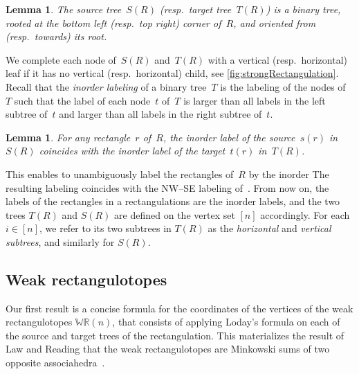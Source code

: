 \documentclass{amsart}
\newtheorem{lemma}[theorem]{Lemma}
\theoremstyle{definition}
\newcommand{\darkblue}{\color{darkblue}} %
\newcommand{\defn}[1]{\textsl{\darkblue #1}} %
\newcommand{\polytope}[1]{\mathds{#1}} %
\newcommand{\WRP}{\polytope{WR}} %
\begin{document}
\begin{lemma}
The source tree~$S(R)$ (resp.~target tree~$T(R)$) is a binary tree, rooted at the bottom left (resp.~top right) corner of~$R$, and oriented from (resp.~towards) its root.
\end{lemma}

We complete each node of~$S(R)$ and~$T(R)$ with a vertical (resp.~horizontal) leaf if it has no vertical (resp.~horizontal) child, see \cref{fig:strongRectangulation}.
Recall that the \defn{inorder labeling} of a binary tree~$T$ is the labeling of the nodes of~$T$ such that the label of each node~$t$ of~$T$ is larger than all labels in the left subtree of~$t$ and larger than all labels in the right subtree of~$t$.

\begin{lemma}
For any rectangle~$r$ of~$R$, the inorder label of the source~$s(r)$ in~$S(R)$ coincides with the inorder label of the target~$t(r)$ in~$T(R)$.
\end{lemma}

This enables to unambiguously label the rectangles of~$R$ by the inorder 
The resulting labeling coincides with the NW--SE labeling of~\cite{ACFF24}.
From now on, the labels of the rectangles in a rectangulations are the inorder labels, and the two trees $T(R)$ and $S(R)$ are defined on the vertex set $[n]$ accordingly.
For each $i\in [n]$, we refer to its two subtrees in $T(R)$ as the \defn{horizontal} and \defn{vertical subtrees}, and similarly for $S(R)$.

\subsection{Weak rectangulotopes}

Our first result is a concise formula for the coordinates of the vertices of the  weak rectangulotopes $\WRP(n)$, that consists of applying Loday's formula on each of the source and target trees of the rectangulation.
This materializes the result of Law and Reading that the weak rectangulotopes are Minkowski sums of two opposite associahedra~\cite{MR2871762}.
\end{document}
